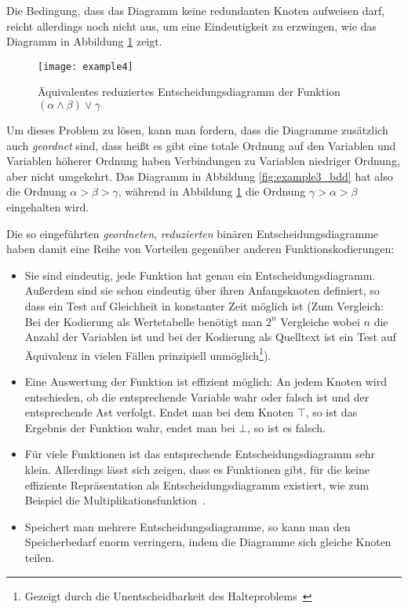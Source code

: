 Die Bedingung, dass das Diagramm keine redundanten Knoten aufweisen darf, reicht allerdings noch nicht aus, um eine Eindeutigkeit zu erzwingen, wie das Diagramm in Abbildung \ref{fig:example4_bdd} zeigt.
\begin{figure}[h]
  \centering
  \texttt{[image: example4]}
  \caption{Äquivalentes reduziertes Entscheidungsdiagramm der Funktion $(\alpha\land\beta)\lor \gamma$}
  \label{fig:example4_bdd}
\end{figure}

Um dieses Problem zu lösen, kann man fordern, dass die Diagramme zusätzlich auch \emph{geordnet} sind, dass heißt es gibt eine totale Ordnung auf den Variablen und Variablen höherer Ordnung haben Verbindungen zu Variablen niedriger Ordnung, aber nicht umgekehrt.
Das Diagramm in Abbildung \ref{fig:example3_bdd} hat also die Ordnung $\alpha > \beta > \gamma$, während in Abbildung \ref{fig:example4_bdd} die Ordnung $\gamma > \alpha > \beta$ eingehalten wird.

Die so eingeführten \emph{geordneten}, \emph{reduzierten} binären Entscheidungsdiagramme haben damit eine Reihe von Vorteilen gegenüber anderen Funktionskodierungen:
\begin{itemize}
\item Sie sind eindeutig, jede Funktion hat genau ein Entscheidungsdiagramm.
  Außerdem sind sie schon eindeutig über ihren Anfangsknoten definiert, so dass ein Test auf Gleichheit in konstanter Zeit möglich ist (Zum Vergleich: Bei der Kodierung als Wertetabelle benötigt man $2^n$ Vergleiche wobei $n$ die Anzahl der Variablen ist und bei der Kodierung als Quelltext ist ein Test auf Äquivalenz in vielen Fällen prinzipiell unmöglich\footnote{Gezeigt durch die Unentscheidbarkeit des Halteproblems~\cite{halteproblem}}).
\item Eine Auswertung der Funktion ist effizient möglich:
  An jedem Knoten wird entschieden, ob die entsprechende Variable wahr oder falsch ist und der entsprechende Ast verfolgt.
  Endet man bei dem Knoten $\top$, so ist das Ergebnis der Funktion wahr, endet man bei $\bot$, so ist es falsch.
\item Für viele Funktionen ist das entsprechende Entscheidungsdiagramm sehr klein.
  Allerdings lässt sich zeigen, dass es Funktionen gibt, für die keine effiziente Repräsentation als Entscheidungsdiagramm existiert, wie zum Beispiel die Multiplikationsfunktion~\cite{Bryant98onthe}.
\item Speichert man mehrere Entscheidungsdiagramme, so kann man den Speicherbedarf enorm verringern, indem die Diagramme sich gleiche Knoten teilen.
\end{itemize}

